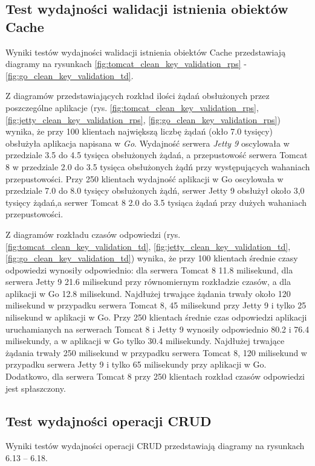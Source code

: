 % 
\clearpage

\subsection{Test wydajności walidacji istnienia obiektów Cache}
Wyniki testów wydajności walidacji istnienia obiektów Cache przedstawiają diagramy na rysunkach \ref{fig:tomcat_clean_key_validation_rps} - \ref{fig:go_clean_key_validation_td}.              

Z diagramów przedstawiających rozkład ilości żądań obsłużonych przez poszczególne aplikacje  (rys. \ref{fig:tomcat_clean_key_validation_rps}, \ref{fig:jetty_clean_key_validation_rps}, \ref{fig:go_clean_key_validation_rps}) wynika, że przy 100 klientach największą liczbę żądań (okło 7.0 tysięcy) obsłużyła aplikacja napisana w \textsl{Go}. Wydajność serwera \textsl{Jetty 9} oscylowała w przedziale 3.5 do 4.5 tysięca obsłużonych żądań, a przepustowość serwera Tomcat 8 w przedziale 2.0 do 3.5 tysięca obsłużonych żądń przy występujących wahaniach przepustowości. Przy 250 klientach wydajność aplikacji w Go oscylowała w przedziale 7.0 do 8.0 tysięcy obsłużonych żądń, serwer Jetty 9 obsłużył około 3,0 tysięcy żądań,a serwer Tomcat 8  2.0 do 3.5 tysiąca żądań przy dużych wahaniach przepustowości.


Z diagramów rozkładu czasów odpowiedzi (rys. \ref{fig:tomcat_clean_key_validation_td}, \ref{fig:jetty_clean_key_validation_td}, \ref{fig:go_clean_key_validation_td}) wynika, że przy 100 klientach średnie czasy odpowiedzi wynosiły odpowiednio: dla serwera Tomcat 8 11.8 milisekund, dla serwera Jetty 9 21.6 milisekund przy równomiernym rozkładzie czasów, a dla aplikacji w Go 12.8 milisekund. Najdłużej trwające żądania trwały około 120 milisekund w przypadku serwera Tomcat 8, 45 milisekund przy  Jetty 9 i tylko 25 nilisekund w aplikacji w Go. Przy 250 klientach średnie czas odpowiedzi aplikacji uruchamianych na serwerach Tomcat 8 i Jetty 9  wynosiły  odpowiednio 80.2 i 76.4 milisekundy, a w aplikacji w Go tylko 30.4 milisekundy. Najdłużej trwające żądania trwały 250 milisekund w przypadku serwera Tomcat 8, 120 milisekund w przypadku serwera Jetty 9 i tylko 65 milisekundy przy aplikacji w Go. Dodatkowo, dla serwera Tomcat 8 przy 250 klientach  rozkład czasów odpowiedzi jest spłaszczony. 

% 
\clearpage

\subsection{Test wydajności operacji CRUD}
Wyniki testów wydajności operacji CRUD przedstawiają diagramy na rysunkach 6.13 – 6.18.

